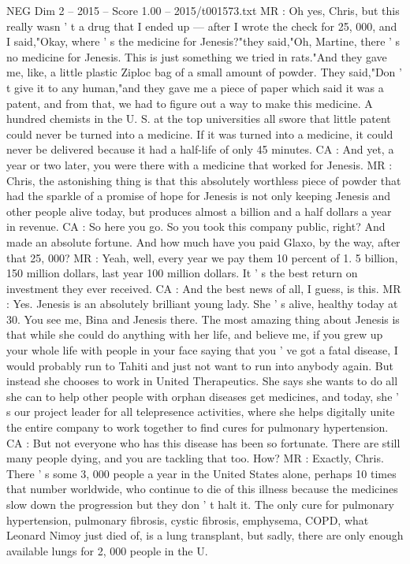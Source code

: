 \begin{textsample}{NEG Dim 2 – 2015 – Score 1.00 – 2015/t001573.txt}
MR : Oh yes, Chris, but this really wasn ' t a drug that I ended up — after I wrote the check for 25, 000, and I said,"Okay, where ' s the medicine for Jenesis?"they said,"Oh, Martine, there ' s no medicine for Jenesis.
This is just something we tried in rats."And they gave me, like, a little plastic Ziploc bag of a small amount of powder.
They said,"Don ' t give it to any human,"and they gave me a piece of paper which said it was a patent, and from that, we had to figure out a way to make this medicine.
A hundred chemists in the U.
S. at the top universities all swore that little patent could never be turned into a medicine.
If it was turned into a medicine, it could never be delivered because it had a half-life of only 45 minutes.
CA : And yet, a year or two later, you were there with a medicine that worked for Jenesis.
MR : Chris, the astonishing thing is that this absolutely worthless piece of powder that had the sparkle of a promise of hope for Jenesis is not only keeping Jenesis and other people alive today, but produces almost a billion and a half dollars a year in revenue.
CA : So here you go.
So you took this company public, right?
And made an absolute fortune.
And how much have you paid Glaxo, by the way, after that 25, 000?
MR : Yeah, well, every year we pay them 10 percent of 1. 5 billion, 150 million dollars, last year 100 million dollars.
It ' s the best return on investment they ever received.
CA : And the best news of all, I guess, is this.
MR : Yes.
Jenesis is an absolutely brilliant young lady.
She ' s alive, healthy today at 30.
You see me, Bina and Jenesis there.
The most amazing thing about Jenesis is that while she could do anything with her life, and believe me, if you grew up your whole life with people in your face saying that you ' ve got a fatal disease, I would probably run to Tahiti and just not want to run into anybody again.
But instead she chooses to work in United Therapeutics.
She says she wants to do all she can to help other people with orphan diseases get medicines, and today, she ' s our project leader for all telepresence activities, where she helps digitally unite the entire company to work together to find cures for pulmonary hypertension.
CA : But not everyone who has this disease has been so fortunate.
There are still many people dying, and you are tackling that too.
How?
MR : Exactly, Chris.
There ' s some 3, 000 people a year in the United States alone, perhaps 10 times that number worldwide, who continue to die of this illness because the medicines slow down the progression but they don ' t halt it.
The only cure for pulmonary hypertension, pulmonary fibrosis, cystic fibrosis, emphysema, COPD, what Leonard Nimoy just died of, is a lung transplant, but sadly, there are only enough available lungs for 2, 000 people in the U.

\end{textsample}
